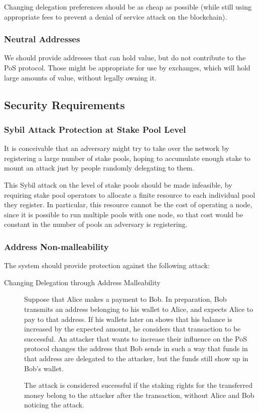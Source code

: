 \documentclass[11pt,a4paper,dvipsnames,twosided]{article}
\begin{document}
Changing delegation preferences should be as cheap as possible (while
still using appropriate fees to prevent a denial of service attack on
the blockchain).

\subsubsection{Neutral Addresses}
\label{neutral-addresses}

We should provide addresses that can hold value, but do not contribute
to the PoS protocol. Those might be appropriate for use by exchanges,
which will hold large amounts of value, without legally owning it.

\subsection{Security Requirements}
\label{security-requirements}

\subsubsection{Sybil Attack Protection at Stake Pool Level}
\label{sybil-attack-protection-at-stake-pool-level}

It is conceivable that an adversary might try to take over the
network by registering a large number of stake pools, hoping to
accumulate enough stake to mount an attack just by people randomly
delegating to them.

This Sybil attack on the level of stake pools should be made infeasible,
by requiring stake pool operators to allocate a finite resource to each
individual pool they register. In particular, this resource cannot be
the cost of operating a node, since it is possible to run multiple pools
with one node, so that cost would be constant in the number of pools an
adversary is registering.

\subsubsection{Address Non-malleability}
\label{address-nonmalleability}

The system should provide protection against the following attack:

\begin{description}
\item[Changing Delegation through Address Malleability]
Suppose that Alice makes a payment to Bob. In preparation, Bob transmits
an address belonging to his wallet to Alice, and expects Alice to pay to
that address. If his wallets later on shows that his balance is
increased by the expected amount, he considers that transaction to be
successful. An attacker that wants to increase their influence on the
PoS protocol changes the address that Bob sends in such a way that funds
in that address are delegated to the attacker, but the funds still show
up in Bob's wallet.

The attack is considered successful if the staking rights for the
transferred money belong to the attacker after the transaction, without
Alice and Bob noticing the attack.
\end{description}
\end{document}
